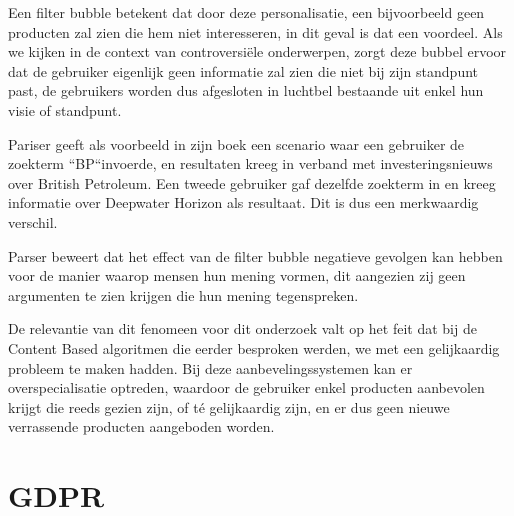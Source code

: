 Een filter bubble betekent dat door deze personalisatie, een bijvoorbeeld geen producten zal zien die hem niet interesseren, in dit geval is dat een voordeel. Als we kijken in de context van controversiële onderwerpen, zorgt deze bubbel ervoor dat de gebruiker eigenlijk geen informatie zal zien die niet bij zijn standpunt past, de gebruikers worden dus afgesloten in luchtbel bestaande uit enkel hun visie of standpunt.  \autocite{Pariser2011}

Pariser geeft als voorbeeld in zijn boek een scenario waar een gebruiker de zoekterm ``BP``invoerde, en resultaten kreeg in verband met investeringsnieuws over British Petroleum. Een tweede gebruiker gaf dezelfde zoekterm in en kreeg informatie over Deepwater Horizon als resultaat. Dit is dus een merkwaardig verschil.

Parser beweert dat het effect van de filter bubble negatieve gevolgen kan hebben voor de manier waarop mensen hun mening vormen, dit aangezien zij geen argumenten te zien krijgen die hun mening tegenspreken.


De relevantie van dit fenomeen voor dit onderzoek valt op het feit dat bij de Content Based algoritmen die eerder besproken werden, we met een gelijkaardig probleem te maken hadden. Bij deze aanbevelingssystemen kan er overspecialisatie optreden, waardoor de gebruiker enkel producten aanbevolen krijgt die reeds gezien zijn, of té gelijkaardig zijn, en er dus geen nieuwe verrassende producten aangeboden worden.

\section{GDPR}
\label{sec:GDPR}



